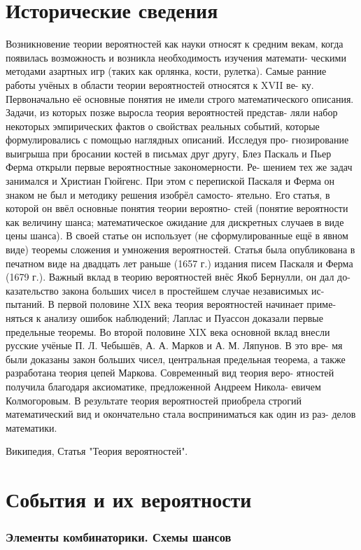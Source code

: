 \part*{Исторические сведения}
Возникновение теории вероятностей как науки относят к средним векам,
когда появилась возможность и возникла необходимость изучения математи-
ческими методами азартных игр (таких как орлянка, кости, рулетка). Самые
ранние работы учёных в области теории вероятностей относятся к XVII ве-
ку. Первоначально её основные понятия не имели строго математического
описания. Задачи, из которых позже выросла теория вероятностей представ-
ляли набор некоторых эмпирических фактов о свойствах реальных событий,
которые формулировались с помощью наглядных описаний. Исследуя про-
гнозирование выигрыша при бросании костей в письмах друг другу, Блез
Паскаль и Пьер Ферма открыли первые вероятностные закономерности. Ре-
шением тех же задач занимался и Христиан Гюйгенс. При этом с перепиской
Паскаля и Ферма он знаком не был и методику решения изобрёл самосто-
ятельно. Его статья, в которой он ввёл основные понятия теории вероятно-
стей (понятие вероятности как величину шанса; математическое ожидание
для дискретных случаев в виде цены шанса). В своей статье он использует
(не сформулированные ещё в явном виде) теоремы сложения и умножения
вероятностей. Статья была опубликована в печатном виде на двадцать лет
раньше (1657 г.) издания писем Паскаля и Ферма (1679 г.).
Важный вклад в теорию вероятностей внёс Якоб Бернулли, он дал до-
казательство закона больших чисел в простейшем случае независимых ис-
пытаний. В первой половине XIX века теория вероятностей начинает приме-
няться к анализу ошибок наблюдений; Лаплас и Пуассон доказали первые
предельные теоремы. Во второй половине XIX века основной вклад внесли
русские учёные П. Л. Чебышёв, А. А. Марков и А. М. Ляпунов. В это вре-
мя были доказаны закон больших чисел, центральная предельная теорема,
а также разработана теория цепей Маркова. Современный вид теория веро-
ятностей получила благодаря аксиоматике, предложенной Андреем Никола-
евичем Колмогоровым. В результате теория вероятностей приобрела строгий
математический вид и окончательно стала восприниматься как один из раз-
делов математики.

Википедия,
Статья "Теория вероятностей".

\part{События и их вероятности}
\section{Элементы комбинаторики. Схемы шансов}

